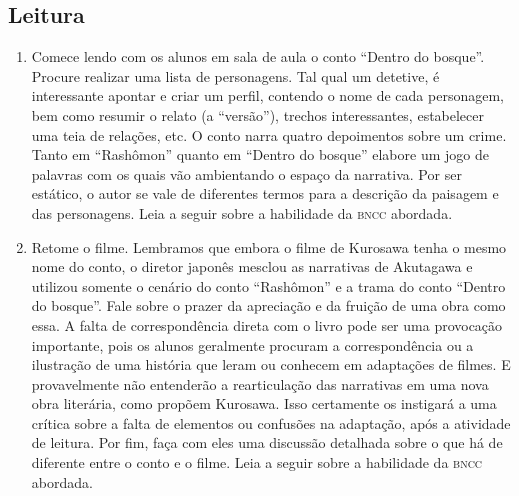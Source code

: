 \documentclass[12pt]{extarticle}
\begin{document}

\subsection{Leitura}

\begin{enumerate} 

\item Comece lendo com os alunos em sala de aula o
conto ``Dentro do bosque''.  Procure realizar uma lista de personagens.
Tal qual um detetive, é interessante apontar e criar um perfil, contendo
o nome de cada personagem, bem como resumir o relato (a ``versão''),
trechos interessantes, estabelecer uma teia de relações, etc.  O conto
narra quatro depoimentos sobre um crime. Tanto em ``Rashômon'' quanto em
``Dentro do bosque'' elabore um jogo de palavras com os quais vão ambientando
o espaço da narrativa. 
Por ser estático, o autor se vale de diferentes
termos para a descrição da paisagem e das personagens. 
Leia a seguir sobre a habilidade da \textsc{bncc} abordada.



\item Retome o filme. Lembramos que embora o filme de Kurosawa tenha o mesmo
nome do conto, o diretor japonês mesclou as narrativas de Akutagawa e
utilizou somente o cenário do conto ``Rashômon'' e a trama do conto ``Dentro 
do bosque''. Fale sobre o prazer da apreciação e da fruição de uma obra como essa. 
A falta de correspondência direta com o livro pode ser uma
provocação importante, pois os alunos geralmente procuram a correspondência
ou a ilustração de uma história que leram ou conhecem em adaptações de
filmes. E provavelmente não entenderão a rearticulação das narrativas em
uma nova obra literária, como propõem Kurosawa. Isso certamente os
instigará a uma crítica sobre a falta de elementos ou confusões na
adaptação, após a atividade de leitura. Por fim, faça com eles uma
discussão detalhada sobre o que há de diferente entre o conto e o filme. 
Leia a seguir sobre a habilidade da \textsc{bncc} abordada.

\end{enumerate}
 
\end{document}

